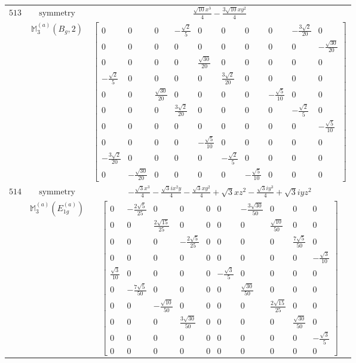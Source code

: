 \documentclass[fleqn,8pt,landscape]{jsarticle}
\begin{document}
\begin{longtable}{ccc}
$ 513 $ & $ \text{symmetry} $ & $ \frac{\sqrt{10} x^{3}}{4} - \frac{3 \sqrt{10} x y^{2}}{4} $ \\
$  $ & $ \mathbb{M}_{3}^{(a)}(B_{g},2) $ & $ \begin{bmatrix} 0 & 0 & 0 & - \frac{\sqrt{2}}{5} & 0 & 0 & 0 & 0 & - \frac{3 \sqrt{2}}{20} & 0 \\ 0 & 0 & 0 & 0 & 0 & 0 & 0 & 0 & 0 & - \frac{\sqrt{30}}{20} \\ 0 & 0 & 0 & 0 & \frac{\sqrt{30}}{20} & 0 & 0 & 0 & 0 & 0 \\ - \frac{\sqrt{2}}{5} & 0 & 0 & 0 & 0 & \frac{3 \sqrt{2}}{20} & 0 & 0 & 0 & 0 \\ 0 & 0 & \frac{\sqrt{30}}{20} & 0 & 0 & 0 & 0 & - \frac{\sqrt{5}}{10} & 0 & 0 \\ 0 & 0 & 0 & \frac{3 \sqrt{2}}{20} & 0 & 0 & 0 & 0 & - \frac{\sqrt{2}}{5} & 0 \\ 0 & 0 & 0 & 0 & 0 & 0 & 0 & 0 & 0 & - \frac{\sqrt{5}}{10} \\ 0 & 0 & 0 & 0 & - \frac{\sqrt{5}}{10} & 0 & 0 & 0 & 0 & 0 \\ - \frac{3 \sqrt{2}}{20} & 0 & 0 & 0 & 0 & - \frac{\sqrt{2}}{5} & 0 & 0 & 0 & 0 \\ 0 & - \frac{\sqrt{30}}{20} & 0 & 0 & 0 & 0 & - \frac{\sqrt{5}}{10} & 0 & 0 & 0 \end{bmatrix} $ \\ \hline
$ 514 $ & $ \text{symmetry} $ & $ - \frac{\sqrt{3} x^{3}}{4} - \frac{\sqrt{3} i x^{2} y}{4} - \frac{\sqrt{3} x y^{2}}{4} + \sqrt{3} x z^{2} - \frac{\sqrt{3} i y^{3}}{4} + \sqrt{3} i y z^{2} $ \\
$  $ & $ \mathbb{M}_{3}^{(a)}(E_{1g}^{(a)}) $ & $ \begin{bmatrix} 0 & - \frac{2 \sqrt{5}}{25} & 0 & 0 & 0 & 0 & - \frac{3 \sqrt{30}}{50} & 0 & 0 & 0 \\ 0 & 0 & \frac{2 \sqrt{15}}{25} & 0 & 0 & 0 & 0 & \frac{\sqrt{10}}{50} & 0 & 0 \\ 0 & 0 & 0 & - \frac{2 \sqrt{5}}{25} & 0 & 0 & 0 & 0 & \frac{7 \sqrt{5}}{50} & 0 \\ 0 & 0 & 0 & 0 & 0 & 0 & 0 & 0 & 0 & - \frac{\sqrt{3}}{10} \\ \frac{\sqrt{3}}{10} & 0 & 0 & 0 & 0 & - \frac{\sqrt{3}}{5} & 0 & 0 & 0 & 0 \\ 0 & - \frac{7 \sqrt{5}}{50} & 0 & 0 & 0 & 0 & \frac{\sqrt{30}}{50} & 0 & 0 & 0 \\ 0 & 0 & - \frac{\sqrt{10}}{50} & 0 & 0 & 0 & 0 & \frac{2 \sqrt{15}}{25} & 0 & 0 \\ 0 & 0 & 0 & \frac{3 \sqrt{30}}{50} & 0 & 0 & 0 & 0 & \frac{\sqrt{30}}{50} & 0 \\ 0 & 0 & 0 & 0 & 0 & 0 & 0 & 0 & 0 & - \frac{\sqrt{3}}{5} \\ 0 & 0 & 0 & 0 & 0 & 0 & 0 & 0 & 0 & 0 \end{bmatrix} $ \\ \hline

\end{longtable}
\end{document}
